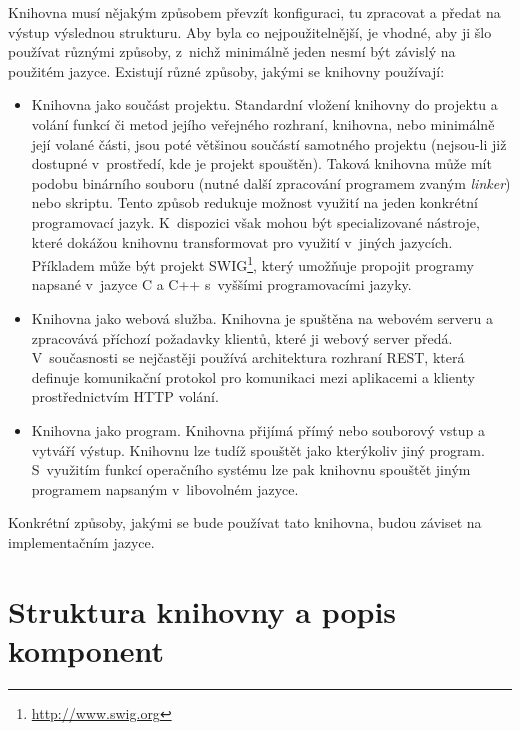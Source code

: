 Knihovna musí nějakým způsobem převzít konfiguraci, tu zpracovat a předat na výstup výslednou strukturu.
Aby byla co nejpoužitelnější, je vhodné, aby ji šlo používat různými způsoby, z~nichž minimálně jeden nesmí být závislý na použitém jazyce.
Existují různé způsoby, jakými se knihovny používají:
\begin{itemize}
  \item{Knihovna jako součást projektu. Standardní vložení knihovny do projektu a volání funkcí či metod jejího veřejného rozhraní, knihovna, nebo minimálně její volané části, jsou poté většinou součástí samotného projektu (nejsou-li již dostupné v~prostředí, kde je projekt spouštěn). Taková knihovna může mít podobu binárního souboru (nutné další zpracování programem zvaným \textit{linker}) nebo skriptu. Tento způsob redukuje možnost využití na jeden konkrétní programovací jazyk. K~dispozici však mohou být specializované nástroje, které dokážou knihovnu transformovat pro využití v~jiných jazycích. Příkladem může být projekt SWIG\footnote{\url{http://www.swig.org}}, který umožňuje propojit programy napsané v~jazyce C a C++ s~vyššími programovacími jazyky.}
  \item{Knihovna jako webová služba. Knihovna je spuštěna na webovém serveru a zpracovává příchozí požadavky klientů, které ji webový server předá. V~současnosti se nejčastěji používá architektura rozhraní REST, která definuje komunikační protokol pro komunikaci mezi aplikacemi a klienty prostřednictvím HTTP volání.}
  \item{Knihovna jako program. Knihovna přijímá přímý nebo souborový vstup a vytváří výstup. Knihovnu lze tudíž spouštět jako kterýkoliv jiný program. S~využitím funkcí operačního systému lze pak knihovnu spouštět jiným programem napsaným v~libovolném jazyce.}
\end{itemize}
Konkrétní způsoby, jakými se bude používat tato knihovna, budou záviset na implementačním jazyce.


\section{Struktura knihovny a popis komponent}


